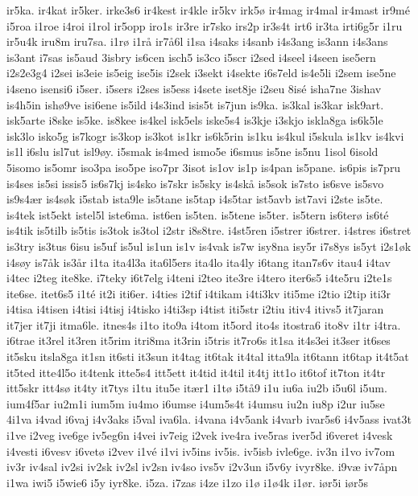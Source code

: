 {ir5ka.
ir4kat
ir5ker.
irke3s6
ir4kest
ir4kle
ir5kv
irk5ø
ir4mag
ir4mal
ir4mast
ir9mé
i5roa
i1roe
i4roi
i1rol
ir5opp
iro1s
ir3re
ir7sko
irs2p
ir3s4t
irt6
ir3ta
irti6g5r
i1ru
ir5u4k
iru8m
iru7sa.
i1rø
i1rå
ir7å6l
i1sa
i4saks
i4sanb
i4s3ang
is3ann
i4s3ans
is3ant
i7sas
is5aud
3isbry
is6cen
isch5
is3co
i5scr
i2sed
i4seel
i4seen
ise5ern
i2s2e3g4
i2sei
is3eie
is5eig
ise5is
i2sek
i3sekt
i4sekte
i6s7eld
is4e5li
i2sem
ise5ne
i4seno
isensi6
i5ser.
i5sers
i2ses
is5ess
i4sete
iset8je
i2seu
8isé
isha7ne
3ishav
is4h5in
ishø9ve
isi6ene
is5ild
i4s3ind
isis5t
is7jun
is9ka.
is3kal
is3kar
isk9art.
isk5arte
i8ske
is5ke.
is8kee
is4kel
isk5els
iske5s4
is3kje
i3skjo
iskla8ga
is6k5le
isk3lo
isko5g
is7kogr
is3kop
is3kot
is1kr
is6k5rin
is1ku
is4kul
i5skula
is1kv
is4kvi
is1l
i6slu
isl7ut
isl9øy.
i5smak
is4med
ismo5e
i6smus
is5ne
is5nu
1isol
6isold
5isomo
is5omr
iso3pa
iso5pe
iso7pr
3isot
is1ov
is1p
is4pan
is5pane.
is6pis
is7pru
is4ses
is5si
issis5
is6s7kj
is4sko
is7skr
is5sky
is4skå
is5sok
is7sto
is6sve
is5svo
is9s4ær
is4søk
i5stab
ista9le
is5tane
is5tap
i4s5tar
ist5avb
ist7avi
i2ste
is5te.
is4tek
ist5ekt
istel5l
iste6ma.
ist6en
is5ten.
is5tene
is5ter.
is5tern
is6terø
is6té
is4tik
is5tilb
is5tis
is3tok
is3tol
i2str
i8s8tre.
i4st5ren
i5strer
i6strer.
i4stres
i6stret
is3try
is3tus
6isu
is5uf
is5ul
is1un
is1v
is4vak
is7w
isy8na
isy5r
i7s8ys
is5yt
i2s1øk
i4søy
is7åk
is3år
i1ta
ita4l3a
ita6l5ers
ita4lo
ita4ly
i6tang
itan7s6v
itau4
i4tav
i4tec
i2teg
ite8ke.
i7teky
i6t7elg
i4teni
i2teo
ite3re
i4tero
iter6s5
i4te5ru
i2te1s
ite6se.
itet6s5
i1té
it2i
iti6er.
i4ties
i2tif
i4tikam
i4ti3kv
iti5me
i2tio
i2tip
iti3r
i4tisa
i4tisen
i4tisi
i4tisj
i4tisko
i4ti3sp
i4tist
iti5str
i2tiu
itiv4
itivs5
it7jaran
it7jer
it7ji
itma6le.
itnes4s
i1to
ito9a
i4tom
it5ord
ito4s
itostra6
ito8v
i1tr
i4tra.
i6trae
it3rel
it3ren
it5rim
itri8ma
it3rin
i5tris
it7ro6s
it1sa
it4s3ei
it3ser
it6ses
it5sku
itsla8ga
it1sn
it6sti
it3sun
it4tag
it6tak
it4tal
itta9la
it6tann
it6tap
it4t5at
it5ted
itte4l5o
it4tenk
itte5s4
itt5ett
it4tid
it4til
it4tj
itt1o
it6tof
it7ton
it4tr
itt5skr
itt4sø
it4ty
it7tys
i1tu
itu5e
itær1
i1tø
i5tå9
i1u
iu6a
iu2b
i5u6l
i5um.
ium4f5ar
iu2m1i
ium5m
iu4mo
i6umse
i4um5s4t
i4umsu
iu2n
iu8p
i2ur
iu5se
4i1va
i4vad
i6vaj
i4v3aks
i5val
iva6la.
i4vana
i4v5ank
i4varb
ivar5s6
i4v5ass
ivat3t
i1ve
i2veg
ive6ge
iv5eg6n
i4vei
iv7eig
i2vek
ive4ra
ive5ras
iver5d
i6veret
i4vesk
i4vesti
i6vesv
i6vetø
i2vev
i1vé
i1vi
iv5ins
iv5is.
iv5isb
ivle6ge.
iv3n
i1vo
iv7om
iv3r
iv4sal
iv2si
iv2sk
iv2sl
iv2sn
iv4so
ivs5v
i2v3un
i5v6y
ivyr8ke.
i9væ
iv7åpn
i1wa
iwi5
i5wie6
i5y
iyr8ke.
i5za.
i7zas
i4ze
i1zo
i1ø
i1ø4k
i1ør.
iør5i
iør5s
}
